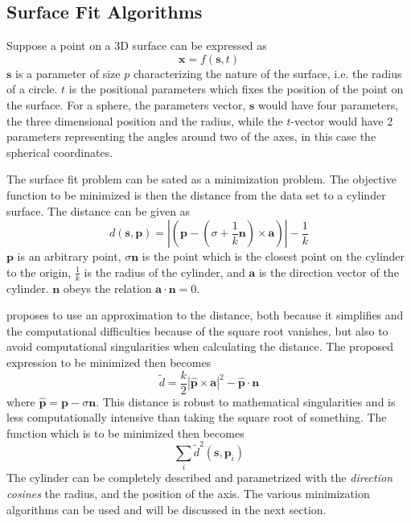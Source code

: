 \subsection{Surface Fit Algorithms}
\label{chap2:sec-surface-fit-alg}
Suppose a point on a 3D surface can be expressed as
\begin{equation}
    \mathbf{x} = f(\mathbf{s}, t)
\end{equation}
$\mathbf{s}$ is a parameter of size $p$ characterizing the nature of the surface, i.e. the
radius of a circle. $t$ is the positional parameters which fixes the position of the point
on the surface. For a sphere, the parameters vector, $\mathbf{s}$ would have four parameters,
the three dimensional position and the radius, while the $t$-vector would have 2
parameters representing the angles around two of the axes, in this case the spherical
coordinates.

The surface fit problem can be sated as a minimization problem. The
objective function to be minimized is then the distance from the data set to a cylinder
surface. The distance can be given as 
\begin{equation}
    d( \mathbf{s}, \mathbf{p})  = | ( \mathbf{p} - (\sigma + \frac{1}{k} \mathbf{n})
    \times \mathbf{a})| - \frac{1}{k}
\end{equation}
$\mathbf{p}$ is an arbitrary point, $\sigma \mathbf{n}$ is the point which is the closest
point on the cylinder to the origin, $\frac{1}{k}$ is the radius of the cylinder, and $\mathbf{a}$ is the
direction vector of the cylinder. $\mathbf{n}$ obeys the relation $\mathbf{a} \cdot
\mathbf{n} = 0$. 

\cite{ls-fit-cylinder} proposes to use an approximation to the distance, both because it
simplifies and the computational difficulties because of the square root vanishes, but
also to avoid computational singularities when calculating the distance. The proposed
expression to be minimized then becomes
\begin{equation}
    \tilde{d} = \frac{k}{2} |\hat{\mathbf{p}} \times \mathbf{a} | ^2 - \hat{\mathbf{p}} \cdot
    \mathbf{n}
\end{equation}
where $\hat{\mathbf{p}} = \mathbf{p} - \sigma \mathbf{n}$. This distance is robust to
mathematical singularities and is less computationally intensive than taking the square
root of something. The function which is to be minimized then becomes
\begin{equation}
    \label{chap2:eq-ls-cylinder-min}
    \sum_i \tilde{d}^2(\mathbf{s}, \mathbf{p}_i)
\end{equation}
The cylinder can be completely described and parametrized with the \emph{direction cosines} the radius, and
the position of the axis. The various minimization algorithms can be used and will be
discussed in the next section.


